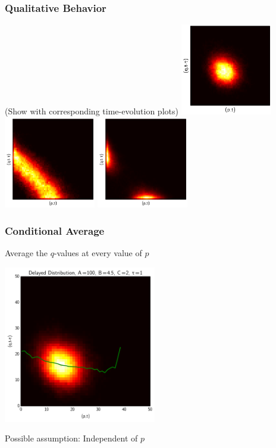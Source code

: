 \documentclass[xcolor={usenames,dvipsnames,svgnames}]{beamer}
\begin{document}
\begin{frame}
    \frametitle{Qualitative Behavior}

    (Show with corresponding time-evolution plots)
    \includegraphics[width=0.3\textwidth]{../results/presentation/ddjd-a100-c1.png}
    \includegraphics[width=0.3\textwidth]{../results/presentation/ddjd-a100-c3,3.png}
    \includegraphics[width=0.3\textwidth]{../results/presentation/ddjd-a100-c4,7.png}
\end{frame}

\begin{frame}
    \frametitle{Conditional Average}

    Average the $q$-values at every value of $p$


    \begin{center}
        \includegraphics[width=0.5\textwidth]{../results/presentation/ddjd-ca-a100-c2-t1.png}
    \end{center}

    Possible assumption: Independent of $p$
\end{frame}
\end{document}
